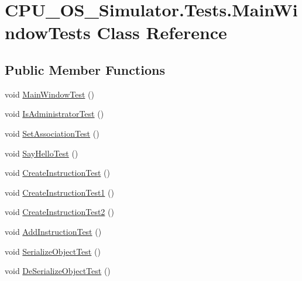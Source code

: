 \hypertarget{class_c_p_u___o_s___simulator_1_1_tests_1_1_main_window_tests}{}\section{C\+P\+U\+\_\+\+O\+S\+\_\+\+Simulator.\+Tests.\+Main\+Window\+Tests Class Reference}
\label{class_c_p_u___o_s___simulator_1_1_tests_1_1_main_window_tests}
\subsection*{Public Member Functions}
\begin{DoxyCompactItemize}
\item 
void \hyperlink{class_c_p_u___o_s___simulator_1_1_tests_1_1_main_window_tests_a1808be52de450a37acac4bf631126be9}{Main\+Window\+Test} ()
\item 
void \hyperlink{class_c_p_u___o_s___simulator_1_1_tests_1_1_main_window_tests_a236895a86bcf066f182a7226b2240eeb}{Is\+Administrator\+Test} ()
\item 
void \hyperlink{class_c_p_u___o_s___simulator_1_1_tests_1_1_main_window_tests_af7d0dc5cdcdf4c52b4e7dfed51186525}{Set\+Association\+Test} ()
\item 
void \hyperlink{class_c_p_u___o_s___simulator_1_1_tests_1_1_main_window_tests_abb7bf4109a46d6acc72dc0bb2a998d95}{Say\+Hello\+Test} ()
\item 
void \hyperlink{class_c_p_u___o_s___simulator_1_1_tests_1_1_main_window_tests_a14272ce6628a74ba9e3c5c08cbf6e3aa}{Create\+Instruction\+Test} ()
\item 
void \hyperlink{class_c_p_u___o_s___simulator_1_1_tests_1_1_main_window_tests_a161f399caa471a9730a275d8dee3fdd5}{Create\+Instruction\+Test1} ()
\item 
void \hyperlink{class_c_p_u___o_s___simulator_1_1_tests_1_1_main_window_tests_abcd2e664ea976aeda82ad56b3561c8b2}{Create\+Instruction\+Test2} ()
\item 
void \hyperlink{class_c_p_u___o_s___simulator_1_1_tests_1_1_main_window_tests_aa3997e6219c108a0c4d13ad38176e15a}{Add\+Instruction\+Test} ()
\item 
void \hyperlink{class_c_p_u___o_s___simulator_1_1_tests_1_1_main_window_tests_a5072771dd6a3f787f2f5b19601b29584}{Serialize\+Object\+Test} ()
\item 
void \hyperlink{class_c_p_u___o_s___simulator_1_1_tests_1_1_main_window_tests_a59259fee04c872d64b964dd0e025447b}{De\+Serialize\+Object\+Test} ()
\end{DoxyCompactItemize}



